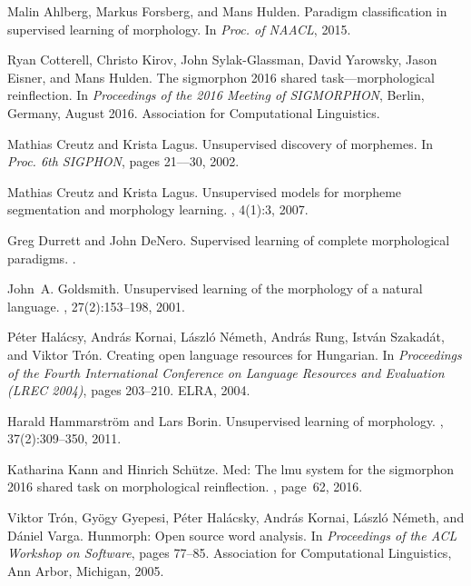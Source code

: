 \documentclass{article}
\begin{document}
\begin{thebibliography}{10}

Malin Ahlberg, Markus Forsberg, and Mans Hulden.
\newblock Paradigm classification in supervised learning of morphology.
\newblock In {\em Proc. of NAACL}, 2015.

Ryan Cotterell, Christo Kirov, John Sylak-Glassman, David Yarowsky, Jason
  Eisner, and Mans Hulden.
\newblock The sigmorphon 2016 shared task---morphological reinflection.
\newblock In {\em Proceedings of the 2016 Meeting of SIGMORPHON}, Berlin,
  Germany, August 2016. Association for Computational Linguistics.

Mathias Creutz and Krista Lagus.
\newblock Unsupervised discovery of morphemes.
\newblock In {\em Proc. 6th SIGPHON}, pages 21--–30, 2002.

Mathias Creutz and Krista Lagus.
\newblock Unsupervised models for morpheme segmentation and morphology
  learning.
,
  4(1):3, 2007.

Greg Durrett and John DeNero.
\newblock Supervised learning of complete morphological paradigms.
.

John~A. Goldsmith.
\newblock Unsupervised learning of the morphology of a natural language.
, 27(2):153--198, 2001.

P\'eter Hal\'acsy, Andr\'as Kornai, L\'aszl\'o N\'emeth, Andr\'as Rung,
  Istv\'an Szakad\'at, and Viktor Tr\'on.
\newblock Creating open language resources for {H}ungarian.
\newblock In {\em {Proceedings of the Fourth International Conference on
  Language Resources and Evaluation (LREC 2004)}}, pages 203--210. ELRA, 2004.

Harald Hammarstr{\"o}m and Lars Borin.
\newblock Unsupervised learning of morphology.
, 37(2):309--350, 2011.

Katharina Kann and Hinrich Sch{\"u}tze.
\newblock Med: The lmu system for the sigmorphon 2016 shared task on
  morphological reinflection.
, page~62, 2016.

Viktor Tr{\'o}n, Gy\"{o}gy Gyepesi, P\'{e}ter Hal\'{a}csky, Andr\'{a}s Kornai,
  L\'{a}szl\'{o} N\'{e}meth, and D\'{a}niel Varga.
\newblock Hunmorph: Open source word analysis.
\newblock In {\em {Proceedings of the ACL Workshop on Software}}, pages 77--85.
  Association for Computational Linguistics, Ann Arbor, Michigan, 2005.

\end{thebibliography}
\end{document}
